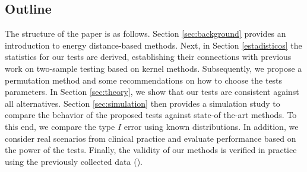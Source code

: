 \documentclass[11pt]{article}
\begin{document}





\subsection{Outline}


 The structure of the paper is as follows. Section \ref{sec:background}  provides an introduction to energy distance-based methods. Next, in Section \ref{estadisticos}
  the statistics for our tests are derived, establishing their connections  with previous  work on two-sample  testing  based on kernel methods. Subsequently, we propose a permutation method and some recommendations on how to choose the tests parameters. In Section \ref{sec:theory},  we show that our tests are consistent  against all alternatives. Section \ref{sec:simulation} then provides a simulation study to compare the behavior of the proposed  tests against state-of the-art methods. To this end, we  compare the type $I$ error using known distributions. In addition, we consider real scenarios from clinical practice and  evaluate performance based  on  the power of the tests.  Finally, the validity of our methods is  verified  in practice using the previously collected data     (\cite{stablein1981analysis}).
\end{document}
